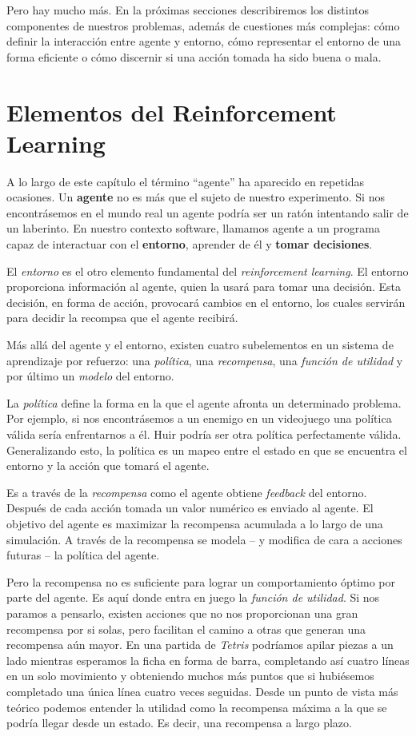 Pero hay mucho más. En la próximas secciones describiremos los distintos componentes de nuestros problemas, además de cuestiones más complejas: cómo definir la interacción entre agente y entorno, cómo representar el entorno de una forma eficiente o cómo discernir si una acción tomada ha sido buena o mala.

\section{Elementos del Reinforcement Learning}
A lo largo de este capítulo el término ``agente'' ha aparecido en repetidas ocasiones. Un \textbf{agente} no es más que el sujeto de nuestro experimento. Si nos encontrásemos en el mundo real un agente podría ser un ratón intentando salir de un laberinto. En nuestro contexto software, llamamos agente a un programa capaz de interactuar con el \textbf{entorno}, aprender de él y \textbf{tomar decisiones}.

El \textit{entorno} es el otro elemento fundamental del \textit{reinforcement learning}. El entorno proporciona información al agente, quien la usará para tomar una decisión. Esta decisión, en forma de acción, provocará cambios en el entorno, los cuales servirán para decidir la recompsa que el agente recibirá.

Más allá del agente y el entorno, existen cuatro subelementos en un sistema de aprendizaje por refuerzo: una \textit{política}, una \textit{recompensa}, una \textit{función de utilidad} y por último un \textit{modelo} del entorno.

La \textit{política} define la forma en la que el agente afronta un determinado problema. Por ejemplo, si nos encontrásemos a un enemigo en un videojuego una política válida sería enfrentarnos a él. Huir podría ser otra política perfectamente válida. Generalizando esto, la política es un mapeo entre el estado en que se encuentra el entorno y la acción que tomará el agente.

Es a través de la \textit{recompensa} como el agente obtiene \textit{feedback} del entorno. Después de cada acción tomada un valor numérico es enviado al agente. El objetivo del agente es maximizar la recompensa acumulada a lo largo de una simulación. A través de la recompensa se modela – y modifica de cara a acciones futuras – la política del agente.

Pero la recompensa no es suficiente para lograr un comportamiento óptimo por parte del agente. Es aquí donde entra en juego la \textit{función de utilidad}. Si nos paramos a pensarlo, existen acciones que no nos proporcionan una gran recompensa por si solas, pero facilitan el camino a otras que generan una recompensa aún mayor. En una partida de \textit{Tetris} podríamos apilar piezas a un lado mientras esperamos la ficha en forma de barra, completando así cuatro líneas en un solo movimiento y obteniendo muchos más puntos que si hubiésemos completado una única línea cuatro veces seguidas. Desde un punto de vista más teórico podemos entender la utilidad como la recompensa máxima a la que se podría llegar desde un estado. Es decir, una recompensa a largo plazo.

